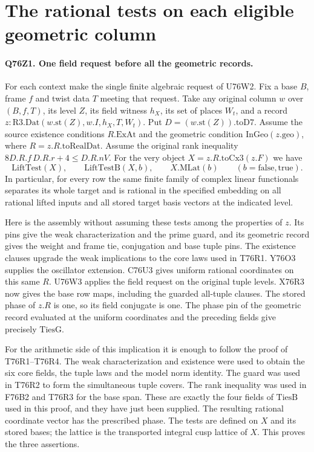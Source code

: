 \section{The rational tests on each eligible geometric column}

\paragraph{Q76Z1. One field request before all the geometric records.}
For each context make the single finite algebraic request of U76W2.
Fix a base $B$, frame $f$ and twist data $T$ meeting that request.
Take any original column $w$ over $(B,f,T)$,
its level $Z$, its field witness $h_X$, its set of places $W_t$,
and a record $z:\mathrm{R3.Dat}(w.\mathrm{st}(Z),w.I,h_X,T,W_t)$.
Put $D=(w.\mathrm{st}(Z)).\mathrm{toD7}$.
Assume the source existence conditions $R.\mathrm{ExAt}$ and
the geometric condition $\mathrm{InGeo}(z.\mathrm{geo})$, where
$R=z.R.\mathrm{toRealDat}$. Assume the original rank inequality
$8D.R.f\,D.R.r+4\le D.R.nV$. For the very object
$X=z.R.\mathrm{toCx3}(z.F)$ we have
\[
   \mathrm{LiftTest}(X),\qquad
   \mathrm{LiftTestB}(X,b),\qquad X.\mathrm{MLat}(b)
       \qquad(b=\mathrm{false},\mathrm{true}).
\]
In particular, for every row the same finite family of complex
linear functionals separates its whole target and is rational in
the specified embedding on all rational lifted inputs and all
stored target basis vectors at the indicated level.

Here is the assembly without assuming these tests among the
properties of $z$. Its pins give the weak characterization
and the prime guard, and its geometric record gives the
weight and frame tie, conjugation and base tuple pins. The
existence clauses upgrade the weak implications to the core
laws used in T76R1. Y76O3 supplies the oscillator extension.
C76U3 gives uniform rational coordinates on this same $R$.
U76W3 applies the field request on the original tuple levels.
X76R3 now gives the base row maps, including the guarded
all-tuple clauses. The stored phase of $z.R$ is one, so its
field conjugate is one. The phase pin of the geometric record
evaluated at the uniform coordinates and the preceding fields
give precisely $\mathrm{TiesG}$.

For the arithmetic side of this implication it is enough to
follow the proof of T76R1--T76R4. The weak characterization
and existence were used to obtain the six core fields, the tuple
laws and the model norm identity. The guard was used in T76R2
to form the simultaneous tuple covers. The rank inequality was
used in F76B2 and T76R3 for the base span. These are exactly the
four fields of $\mathrm{TiesB}$ used in this proof, and they
have just been supplied. The resulting rational coordinate
vector has the prescribed phase. The tests are defined on $X$
and its stored bases; the lattice is the transported integral
cusp lattice of $X$. This proves the three assertions.

